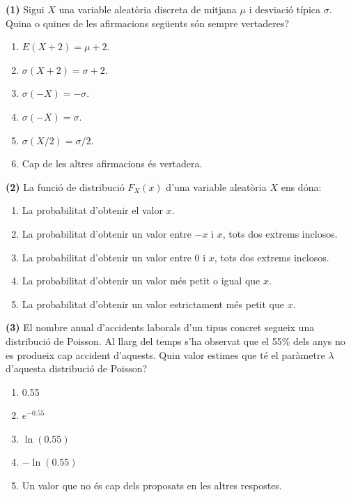 \documentclass[
]{book}
\providecommand{\tightlist}{%
  \setlength{\itemsep}{0pt}\setlength{\parskip}{0pt}}
\theoremstyle{definition}
\theoremstyle{definition}
\theoremstyle{definition}
\theoremstyle{remark}
\begin{document}
\textbf{(1)} Sigui \(X\) una variable aleatòria discreta de mitjana \(\mu\) i desviació típica \(\sigma\). Quina o quines de les afirmacions següents són sempre vertaderes?

\begin{enumerate}
\def\labelenumi{\arabic{enumi}.}
\tightlist
\item
  \(E(X+2)=\mu+2\).
\item
  \(\sigma(X+2)=\sigma+2\).
\item
  \(\sigma(-X)=-\sigma\).
\item
  \(\sigma(-X)=\sigma\).
\item
  \(\sigma(X/2)=\sigma/2\).
\item
  Cap de les altres afirmacions és vertadera.
\end{enumerate}

\textbf{(2)} La funció de distribució \(F_X(x)\) d'una variable aleatòria \(X\) ens dóna:

\begin{enumerate}
\def\labelenumi{\arabic{enumi}.}
\tightlist
\item
  La probabilitat d'obtenir el valor \(x\).
\item
  La probabilitat d'obtenir un valor entre \(-x\) i \(x\), tots dos extrems inclosos.
\item
  La probabilitat d'obtenir un valor entre \(0\) i \(x\), tots dos extrems inclosos.
\item
  La probabilitat d'obtenir un valor més petit o igual que \(x\).
\item
  La probabilitat d'obtenir un valor estrictament més petit que \(x\).
\end{enumerate}

\textbf{(3)} El nombre anual d'accidents laborals d'un tipus concret segueix una distribució de Poisson. Al llarg del temps s'ha observat que el 55\% dels anys no es produeix cap accident d'aquests. Quin valor estimes que té el paràmetre \(\lambda\) d'aquesta distribució de Poisson?

\begin{enumerate}
\def\labelenumi{\arabic{enumi}.}
\tightlist
\item
  0.55
\item
  \(e^{-0.55}\)
\item
  \(\ln(0.55)\)
\item
  \(-\ln(0.55)\)
\item
  Un valor que no és cap dels proposats en les altres respostes.
\end{enumerate}
\end{document}
